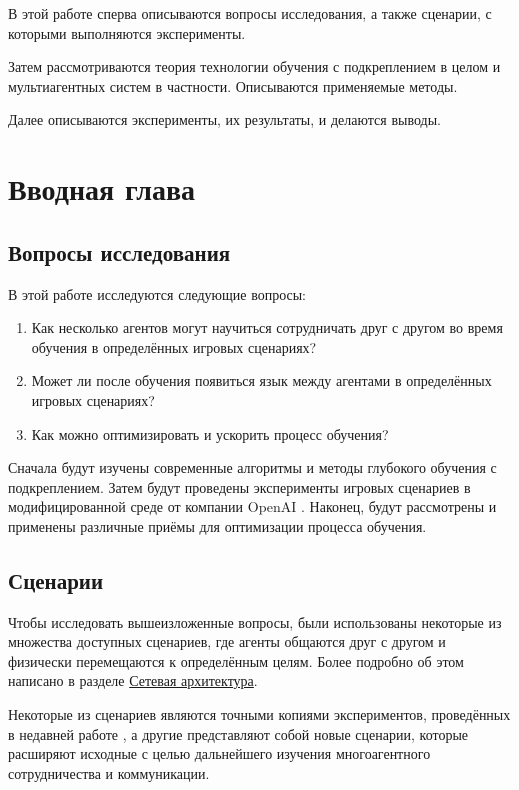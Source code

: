 В этой работе сперва описываются вопросы исследования, а также сценарии, с которыми выполняются эксперименты.

Затем рассмотриваются теория технологии обучения с подкреплением в целом и мультиагентных систем в частности. Описываются применяемые методы.

Далее описываются эксперименты, их результаты, и делаются выводы.


\chapter{Вводная глава}


\section{Вопросы исследования} \label{intro-questions}

В этой работе исследуются следующие вопросы:
\begin{enumerate}[1.]
    \item Как несколько агентов могут научиться сотрудничать друг с другом во время обучения в определённых игровых сценариях?
    \item Может ли после обучения появиться язык между агентами в определённых игровых сценариях?
    \item Как можно оптимизировать и ускорить процесс обучения?
\end{enumerate}

Сначала будут изучены современные алгоритмы и методы глубокого обучения с подкреплением. Затем будут проведены эксперименты игровых сценариев в модифицированной среде от компании OpenAI \cite{OpenAI-Gym}. Наконец, будут рассмотрены и применены различные приёмы для оптимизации процесса обучения.


\section{Сценарии} \label{intro:sec2}

Чтобы исследовать вышеизложенные вопросы, были использованы некоторые из множества доступных сценариев, где агенты общаются друг с другом и физически перемещаются к определённым целям. Более подробно об этом написано в разделе \hyperref[network-architecture]{Сетевая архитектура}.

Некоторые из сценариев являются точными копиями экспериментов, проведённых в недавней работе \cite{lowe2017multiagent}, а другие представляют собой новые сценарии, которые расширяют исходные с целью дальнейшего изучения многоагентного сотрудничества и коммуникации.

